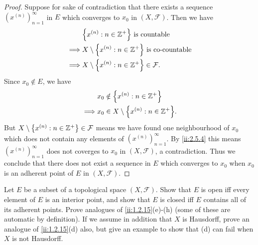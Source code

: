 \begin{proof}
  Suppose for sake of contradiction that there exists a sequence \((x^{(n)})_{n = 1}^\infty\) in \(E\) which converges to \(x_0\) in \((X, \mathcal{F})\).
  Then we have
  \begin{align*}
             & \set{x^{(n)} : n \in \Z^+} \text{ is countable}                \\
    \implies & X \setminus \set{x^{(n)} : n \in \Z^+} \text{ is co-countable} \\
    \implies & X \setminus \set{x^{(n)} : n \in \Z^+} \in \mathcal{F}.
  \end{align*}
  Since \(x_0 \notin E\), we have
  \begin{align*}
             & x_0 \notin \set{x^{(n)} : n \in \Z^+}           \\
    \implies & x_0 \in X \setminus \set{x^{(n)} : n \in \Z^+}.
  \end{align*}
  But \(X \setminus \left\lbrace x^{(n)} : n \in \mathbb{Z}^+\right\rbrace \in \mathcal{F}\) means we have found one neighbourhood of \(x_0\) which does not contain any elements of \((x^{(n)})_{n = 1}^\infty\).
  By \cref{ii:2.5.4} this means \((x^{(n)})_{n = 1}^\infty\) does not coverges to \(x_0\) in \((X, \mathcal{F})\), a contradiction.
  Thus we conclude that there does not exist a sequence in \(E\) which converges to \(x_0\) when \(x_0\) is an adherent point of \(E\) in \((X, \mathcal{F})\).
\end{proof}

\begin{ex}\label{ii:ex:2.5.11}
  Let \(E\) be a subset of a topological space \((X, \mathcal{F})\).
  Show that \(E\) is open iff every element of \(E\) is an interior point, and show that \(E\) is closed iff \(E\) contains all of its adherent points.
  Prove analogues of \cref{ii:1.2.15}(e)-(h) (some of these are automatic by definition).
  If we assume in addition that \(X\) is Hausdorff, prove an analogue of \cref{ii:1.2.15}(d) also, but give an example to show that (d) can fail when \(X\) is not Hausdorff.
\end{ex}

